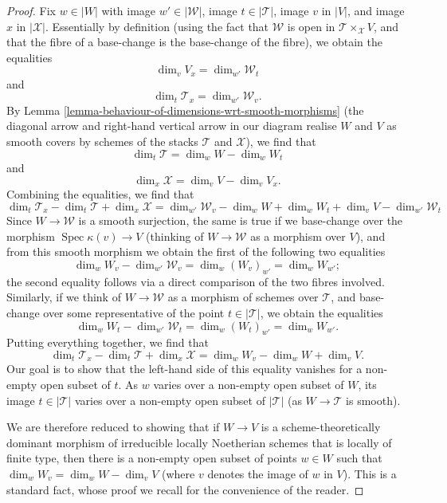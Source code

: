 \documentclass[10pt,a4paper]{amsart}
\theoremstyle{plain}
\theoremstyle{definition}
\theoremstyle{remark}
\numberwithin{equation}{subsection}
\def\Spec{\mathop{\mathrm{Spec}}}
\begin{document}
\begin{proof}
\medskip\noindent
Fix $w \in |W|$ with image $w' \in |\mathcal{W}|$,
image $t \in |\mathcal{T}|$, image $v$ in $|V|$,
and image $x$ in $|\mathcal{X}|$.
Essentially by definition (using the
fact that $\mathcal{W}$ is open in $\mathcal{T}\times_{\mathcal{X}} V$, and that
the fibre of a base-change is the base-change of the fibre),
we obtain the equalities
$$
\dim_v V_x = \dim_{w'} \mathcal{W}_t
$$
and
$$
\dim_t \mathcal{T}_x = \dim_{w'} \mathcal{W}_v.
$$
By Lemma \ref{lemma-behaviour-of-dimensions-wrt-smooth-morphisms}
(the diagonal arrow and right-hand vertical
arrow in our diagram realise $W$ and $V$ as smooth covers by
schemes of the stacks $\mathcal{T}$ and $\mathcal{X}$), we find that
$$
\dim_t \mathcal{T} = \dim_w W - \dim_w W_t
$$
and
$$
\dim_x \mathcal{X} = \dim_v V - \dim_v V_x.
$$
Combining the equalities, we find that
$$
\dim_t \mathcal{T}_x - \dim_t \mathcal{T} + \dim_x \mathcal{X}
= \dim_{w'} \mathcal{W}_v - \dim_w W + \dim_w W_t + \dim_v V -
\dim_{w'} \mathcal{W}_t
$$
Since $W \to \mathcal{W}$ is a smooth surjection, the same is true
if we base-change over the morphism $\Spec \kappa(v) \to V$
(thinking of $W \to \mathcal{W}$ as a morphism over $V$),
and from this smooth morphism we obtain the first of the following
two equalities
$$
\dim_w W_v - \dim_{w'} \mathcal{W}_v = \dim_w (W_v)_{w'} = \dim_w W_{w'};
$$
the second equality follows via a direct comparison of the
two fibres involved.
Similarly, if we think of $W \to \mathcal{W}$ as a morphism of schemes
over $\mathcal{T}$, and base-change over some representative of the point
$t \in |\mathcal{T}|$, we obtain the equalities
$$
\dim_w W_t - \dim_{w'} \mathcal{W}_t = \dim_w (W_t)_{w'} = \dim_w W_{w'}.
$$
Putting everything together, we find that
$$
\dim_t \mathcal{T}_x - \dim_t \mathcal{T} + \dim_x \mathcal{X}
=  \dim_w W_v - \dim_w W + \dim_v V.
$$
Our goal is to show that the left-hand side of this equality
vanishes for a non-empty open subset
of $t$.  As $w$ varies over a non-empty open subset of $W$,
its image $t \in |\mathcal{T}|$ varies over a non-empty open
subset of $|\mathcal{T}|$ (as $W \to \mathcal{T}$ is smooth).

\medskip\noindent
We are therefore reduced to showing that if $W\to V$ is a
scheme-theoretically dominant morphism of irreducible locally
Noetherian schemes that is locally of finite type,
then there is a non-empty open subset of
points $w\in W$ such that $\dim_w W_v =\dim_w W - \dim_v V$
(where $v$ denotes the image of $w$ in $V$).
This is a standard fact,
whose proof we recall for the convenience of the reader.


\end{proof}
\end{document}
